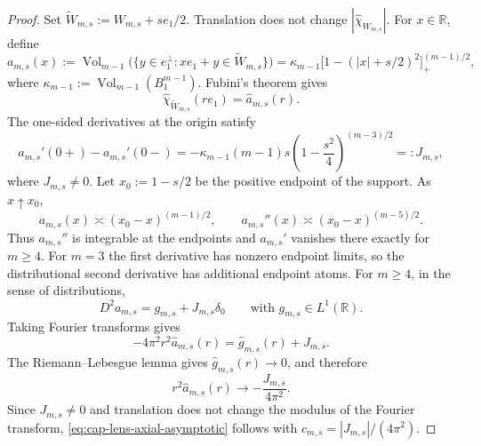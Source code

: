 \documentclass[11pt,reqno,a4paper]{amsart}
\numberwithin{equation}{section}
\theoremstyle{compact}
\theoremstyle{definition}
\theoremstyle{definition}
\newcommand{\Vol}{\operatorname{Vol}}
\begin{document}
\begin{proof}
Set \(\widetilde W_{m,s}:=W_{m,s}+se_1/2\).  Translation does not change
\(|\widehat{\chi}_{W_{m,s}}|\).  For \(x\in\mathbb R\), define
\begin{equation}\label{eq:cap-lens-section-function}
  a_{m,s}(x)
  :=\Vol_{m-1}\bigl(
      \{y\in e_1^\perp:xe_1+y\in\widetilde W_{m,s}\}
    \bigr)
  =\kappa_{m-1}
    \bigl[1-(|x|+s/2)^2\bigr]_+^{(m-1)/2},
\end{equation}
where \(\kappa_{m-1}:=\Vol_{m-1}(B_1^{m-1})\).  Fubini's theorem gives
\begin{equation}\label{eq:cap-lens-axial-slice-fourier}
  \widehat{\chi}_{\widetilde W_{m,s}}(re_1)=\widehat a_{m,s}(r).
\end{equation}
The one-sided derivatives at the origin satisfy
\begin{equation}\label{eq:cap-lens-derivative-jump}
  a_{m,s}'(0+)-a_{m,s}'(0-)
  =-\kappa_{m-1}(m-1)s
    \left(1-\frac{s^2}{4}\right)^{(m-3)/2}
  =:J_{m,s},
\end{equation}
where \(J_{m,s}\neq0\).  Let $x_0:=1-s/2$ be the positive endpoint of the support.  As
$x\uparrow x_0$,
\[
  a_{m,s}(x)\asymp(x_0-x)^{(m-1)/2},
  \qquad
  a_{m,s}''(x)\asymp(x_0-x)^{(m-5)/2}.
\]
Thus $a_{m,s}''$ is integrable at the endpoints and $a_{m,s}'$ vanishes there
exactly for $m\geq4$.  For $m=3$ the first derivative has nonzero endpoint
limits, so the distributional second derivative has additional endpoint
atoms.  For \(m\geq4\), in the sense of distributions,
\begin{equation}\label{eq:cap-lens-second-derivative}
  D^2a_{m,s}=g_{m,s}+J_{m,s}\delta_0
  \qquad\text{with }g_{m,s}\in L^1(\mathbb R).
\end{equation}
Taking Fourier transforms gives
\begin{equation}\label{eq:cap-lens-fourier-second-derivative}
  -4\pi^2r^2\widehat a_{m,s}(r)
  =\widehat g_{m,s}(r)+J_{m,s}.
\end{equation}
The Riemann--Lebesgue lemma gives
$\widehat g_{m,s}(r)\to0$, and therefore
\[
  r^2\widehat a_{m,s}(r)
  \longrightarrow -\frac{J_{m,s}}{4\pi^2}.
\]
Since $J_{m,s}\neq0$ and translation does not change the modulus of the
Fourier transform, \eqref{eq:cap-lens-axial-asymptotic} follows with
$c_{m,s}=|J_{m,s}|/(4\pi^2)$.
\end{proof}
\end{document}
